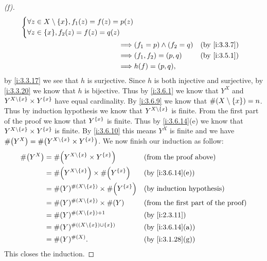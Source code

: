 \begin{proof}[(f)]
\begin{align*}
\begin{dcases}
                 \forall z \in X \setminus \set{x}, f_1(z) = f(z) = p(z) \\
                 \forall z \in \set{x}, f_2(z) = f(z) = q(z)
               \end{dcases}                      \\
    \implies & (f_1 = p) \land (f_2 = q)                                  &  & \by{i:3.3.7} \\
    \implies & (f_1, f_2) = (p, q)                                        &  & \by{i:3.5.1} \\
    \implies & h(f) = (p, q),
  \end{align*}
  by \cref{i:3.3.17} we see that \(h\) is surjective.
  Since \(h\) is both injective and surjective, by \cref{i:3.3.20} we know that \(h\) is bijective.
  Thus by \cref{i:3.6.1} we know that \(Y^X\) and \(Y^{X \setminus \left\lbrace x\right\rbrace} \times Y^{\left\lbrace x\right\rbrace}\) have equal cardinality.
  By \cref{i:3.6.9} we know that \(\#(X \setminus \left\lbrace x\right\rbrace) = n\).
  Thus by induction hypothesis we know that \(Y^{X \setminus \left\lbrace x\right\rbrace}\) is finite.
  From the first part of the proof we know that \(Y^{\left\lbrace x\right\rbrace}\) is finite.
  Thus by \cref{i:3.6.14}(e) we know that \(Y^{X \setminus \left\lbrace x\right\rbrace} \times Y^{\left\lbrace x\right\rbrace}\) is finite.
  By \cref{i:3.6.10} this means \(Y^X\) is finite and we have \(\#\pa{Y^X} = \#\pa{Y^{X \setminus \set{x}} \times Y^{\set{x}}}\).
  We now finish our induction as follow:
  \begin{align*}
    \#\pa{Y^X} & = \#\pa{Y^{X \setminus \set{x}} \times Y^{\set{x}}}         &  & \text{(from the proof above)}             \\
               & = \#\pa{Y^{X \setminus \set{x}}} \times \#\pa{Y^{\set{x}}}  &  & \by{i:3.6.14}[e]                          \\
               & = \#(Y)^{\#(X \setminus \set{x})} \times \#\pa{Y^{\set{x}}} &  & \byIH                                     \\
               & = \#(Y)^{\#(X \setminus \set{x})} \times \#(Y)              &  & \text{(from the first part of the proof)} \\
               & = \#(Y)^{\#(X \setminus \set{x}) + 1}                       &  & \by{i:2.3.11}                             \\
               & = \#(Y)^{\#((X \setminus \set{x}) \cup \set{x})}            &  & \by{i:3.6.14}[a]                          \\
               & = \#(Y)^{\#(X)}.                                            &  & \by{i:3.1.28}[g]
  \end{align*}
  This closes the induction.
\end{proof}

